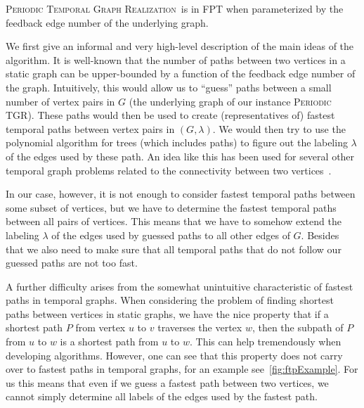 \documentclass[a4paper,UKenglish,cleveref, autoref, thm-restate, anonymous]{lipics-v2021}
\newcommand{\ie}{i.\,e.,\ }
\newcommand{\deltaExactLong}{\textsc{Periodic Temporal Graph Realization}}
\newcommand{\deltaExact}{\textsc{Periodic TGR}}
\begin{document}
\begin{theorem}\label{thm:FPTwrtFES}
    \deltaExactLong\ is in FPT when parameterized by the feedback edge number of the underlying graph.
\end{theorem}

We first give an informal and very high-level description of the main ideas of the algorithm. It is well-known that the number of paths between two vertices in a static graph can be upper-bounded by a function of the feedback edge number of the graph. Intuitively, this would allow us to ``guess'' paths between a small number of vertex pairs in $G$ (the underlying graph of our instance \deltaExact). These paths would then be used to create (representatives of) fastest temporal paths between vertex pairs in $(G,\lambda)$. We would then try to use the polynomial algorithm for trees (which includes paths) to figure out the labeling $\lambda$ of the edges used by these path. An idea like this has been used for several other temporal graph problems related to the connectivity between two vertices~\cite{casteigts2021finding,FMNR22a,EMM22}.

In our case, however, it is not enough to consider fastest temporal paths between some subset of vertices, but we have to determine the fastest temporal paths between all pairs of vertices. This means that we have to somehow extend the labeling $\lambda$ of the edges used by guessed paths to all other edges of $G$.
Besides that we also need to make sure that all temporal paths that do not follow our guessed paths are not too fast. 

	A further difficulty arises from the somewhat unintuitive characteristic of fastest paths in temporal graphs.
 When considering the problem of finding shortest paths between vertices in static graphs, we have the nice property that if a shortest path $P$ from vertex $u$ to $v$ traverses the vertex $w$,
	then the subpath of $P$ from $u$ to $w$ is a shortest path from $u$ to $w$. This can help tremendously when developing algorithms.
	However, one can see that this property does not carry over to fastest paths in temporal graphs, for an example see~\cref{fig:ftpExample}.
 For us this means that even if we guess a fastest path between two vertices, we cannot simply determine all labels of the edges used by the fastest path.
	
\end{document}

